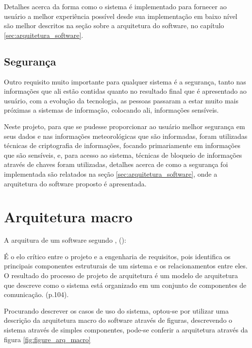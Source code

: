 Detalhes acerca da forma como o sistema é implementado para fornecer ao usuário a melhor experiência possível desde sua implementação em baixo nível são melhor descritos na seção sobre a arquitetura do software, no capítulo \ref{sec:arquitetura_software}.

\subsection{Segurança}

Outro requisito muito importante para qualquer sistema é a segurança, tanto nas informações que ali estão contidas quanto no resultado final que é apresentado ao usuário, com a evolução da tecnologia, as pessoas passaram a estar muito mais próximas a sistemas de informação, colocando ali, informações sensíveis.

Neste projeto, para que se pudesse proporcionar ao usuário melhor segurança em seus dados e nas informações meteorológicas que são informadas, foram utilizadas técnicas de criptografia de informações, focando primariamente em informações que são sensíveis, e, para acesso ao sistema, técnicas de bloqueio de informações através de chaves foram utilizadas, detalhes acerca de como a segurança foi implementada são relatados na seção \ref{sec:arquitetura_software}, onde a arquitetura do software proposto é apresentada.

\section{Arquitetura macro}

A arquitura de um software segundo , (\citeyear{engenharia_software_sommerville}):

\begin{citacao}
    É o elo crítico entre o projeto e a engenharia de requisitos, pois identifica os principais componentes estruturais de um sistema e os relacionamentos entre eles. O resultado do processo de projeto de arquitetura é um modelo de arquitetura que descreve como o sistema está organizado em um conjunto de componentes de comunicação. (p.104).
\end{citacao}

Procurando descrever os casos de uso do sistema, optou-se por utilizar uma descrição da arquitetura macro do software através de figuras, descrevendo o sistema através de simples componentes, pode-se conferir a arquitetura através da figura \ref{fig:figure_arq_macro}

